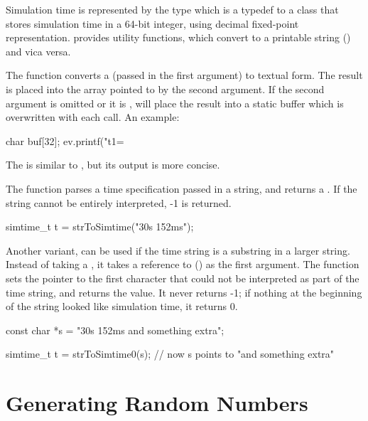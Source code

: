 Simulation time is represented by the type 
which is a typedef to a class that stores simulation time in a 64-bit integer, using
decimal ﬁxed-point representation.
{\opp} provides utility functions, which convert 
to a printable string () and vica versa.

The  function converts a 
(passed in the first argument) to textual form. The result is placed into
the  array pointed to by the second argument. If the second argument is omitted
or it is ,  will place the result into a
static buffer which is overwritten with each call. An example:

\begin{cpp}
char buf[32];
ev.printf("t1=%
\end{cpp}

The  is similar to ,
but its output is more concise.

The  function parses a time specification passed
in a string, and returns a . If the string cannot
be entirely interpreted, -1 is returned.

\begin{cpp}
simtime_t t = strToSimtime("30s 152ms");
\end{cpp}

Another variant,  can be used if the time
string is a substring in a larger string. Instead of taking a ,
it takes a reference to  () as the first argument.  The
function sets the pointer to the first character that could not be
interpreted as part of the time string, and returns the value. It
never returns -1; if nothing at the beginning of the string looked
like simulation time, it returns 0.

\begin{cpp}
const char *s = "30s 152ms and something extra";

simtime_t t = strToSimtime0(s); // now s points to "and something extra"
\end{cpp}


\section{Generating Random Numbers}
\label{cha:sim-lib:generating-random-numbers}

